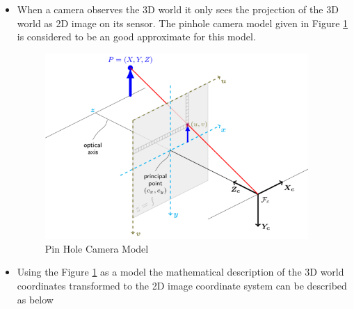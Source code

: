         \begin{itemize}
            \item When a camera observes the 3D world it only sees the projection of the 3D world as 2D image on its sensor. The pinhole camera model  given in Figure            \ref{fig:pin_hole_cam_model} is considered to be an good approximate for this model.
            
            \begin{figure}[H] 
                \centering
                \includegraphics[width=10cm]{"images/experiment_4/pinhole_camera_model.png"}
                \caption{Pin Hole Camera Model \cite{2014opencv} }
                \label{fig:pin_hole_cam_model}
            \end{figure}
                 
                 
            \item  Using the  Figure \ref{fig:pin_hole_cam_model} as a model the mathematical description of the 3D world coordinates transformed to the 2D image coordinate system         can be described as below
                                            

\end{itemize}
